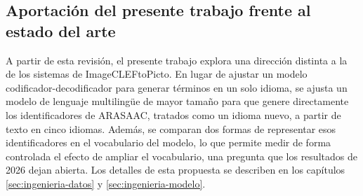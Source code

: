\subsection{Aportación del presente trabajo frente al estado del arte}

A partir de esta revisión, el presente trabajo explora una dirección distinta a la de los sistemas de ImageCLEFtoPicto. En lugar de ajustar un modelo codificador-decodificador para generar términos en un solo idioma, se ajusta un modelo de lenguaje multilingüe de mayor tamaño para que genere directamente los identificadores de ARASAAC, tratados como un idioma nuevo, a partir de texto en cinco idiomas. Además, se comparan dos formas de representar esos identificadores en el vocabulario del modelo, lo que permite medir de forma controlada el efecto de ampliar el vocabulario, una pregunta que los resultados de 2026 dejan abierta. Los detalles de esta propuesta se describen en los capítulos \ref{sec:ingenieria-datos} y \ref{sec:ingenieria-modelo}.
